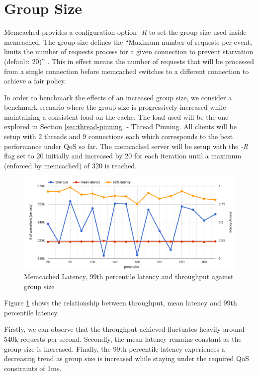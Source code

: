 \section{Group Size}
Memcached provides a configuration option \textit{-R} to set the group size used inside memcached. The group size defines the ``Maximum number of requests per event, limits the number of requests process for a given connection to prevent starvation (default: 20)'' \cite{interactive2006memcached}. This in effect means the number of requests that will be processed from a single connection before memcached switches to a different connection to achieve a fair policy.

In order to benchmark the effects of an increased group size, we consider a benchmark scenario where the group size is progressively increased while maintaining a consistent load on the cache. The load used will be the one explored in Section \ref{sec:thread-pinning} - Thread Pinning. All clients will be setup with 2 threads and 9 connections each which corresponds to the best performance under QoS so far. The memcached server will be setup with the \textit{-R} flag set to 20 initially and increased by 20 for each iteration until a maximum (enforced by memcached) of 320 is reached.

\begin{figure}[h]
    \includegraphics[width=\textwidth]{./res/5_memcached_group_size.png}
    \caption{Memcached Latency, 99th percentile latency and throughput against group size}
    \label{fig:memcached_group_size}
\end{figure}

Figure \ref{fig:memcached_group_size} shows the relationship between throughput, mean latency and 99th percentile latency.

Firstly, we can observe that the throughput achieved fluctuates heavily around 540k requests per second. Secondly, the mean latency remains constant as the group size is increased. Finally, the 99th percentile latency experiences a decreasing trend as group size is increased while staying under the required QoS constraints of 1ms.

